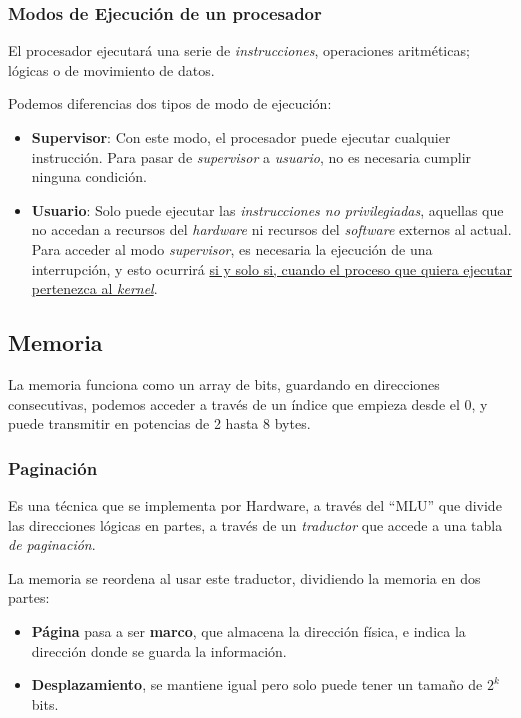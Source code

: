 \subsubsection{Modos de Ejecución de un procesador}
\noindent El procesador ejecutará una serie de \textit{instrucciones}, operaciones aritméticas; lógicas o de movimiento de datos.
\par \vspace{.2cm} \noindent Podemos diferencias dos tipos de modo de ejecución:
\begin{itemize}
        \item \textbf{Supervisor}: Con este modo, el procesador puede ejecutar cualquier instrucción. Para pasar de \textit{supervisor} a \textit{usuario}, no es necesaria cumplir ninguna condición.
        \item \textbf{Usuario}: Solo puede ejecutar las \textit{instrucciones no privilegiadas}, aquellas que no accedan a recursos del \textit{hardware} ni recursos del \textit{software} externos al actual. Para acceder al modo \textit{supervisor}, es necesaria la ejecución de una interrupción, y esto ocurrirá \underline{si y solo si, cuando el proceso que quiera ejecutar pertenezca al \textit{kernel}}.
\end{itemize}
\subsection{Memoria}
\noindent La memoria funciona como un array de bits, guardando en direcciones consecutivas, podemos acceder a través de un índice que empieza desde el 0, y puede transmitir en potencias de 2 hasta 8 bytes.
\subsubsection{Paginación}
\noindent Es una técnica que se implementa por Hardware, a través del ``MLU'' que divide las direcciones lógicas en partes, a través de un \textit{traductor} que accede a una tabla \textit{de paginación}.
\par \vspace{.2cm}\noindent La memoria se reordena al usar este traductor, dividiendo la memoria en dos partes:
\begin{itemize}
        \item \textbf{Página} pasa a ser \textbf{marco}, que almacena la dirección física, e indica la dirección donde se guarda la información.
        \item \textbf{Desplazamiento}, se mantiene igual pero solo puede tener un tamaño de \(2^k\)bits.
\end{itemize}
